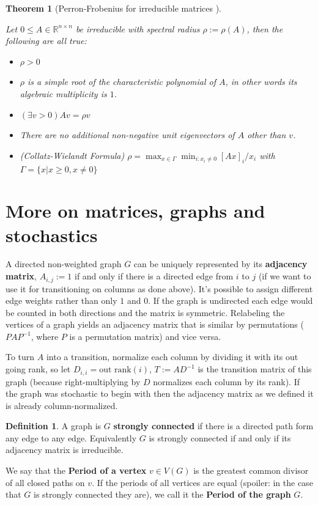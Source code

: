 \documentclass[a4paper,10pt]{article}
\newcommand{\R}{\mathbb{R}}
\newcommand{\gt}{>}
\theoremstyle{definition}
\newtheorem{mydef}{Definition}[section]
\theoremstyle{remark}
\theoremstyle{plain}
\newtheorem{thm}{Theorem}[section]
\begin{document}
\begin{thm}[Perron-Frobenius for irreducible matrices \autocite{meyer2000matrix}]
\label{thm:perron2}

Let $0 \leq A \in \R^{n \times n}$ be irreducible with spectral radius $\rho := \rho(A)$,
then the following are all true:
\begin{itemize}
\item{} $\rho \gt 0$
\item{} $\rho$ is a simple root of the characteristic polynomial of $A$,
in other words its algebraic multiplicity is $1$.
\item{} $(\exists v > 0) Av=\rho v$
\item{} There are no additional non-negative unit eigenvectors of $A$ other than
$v$. 
\item{(Collatz-Wielandt Formula)} $\rho = \max_{x \in \Gamma} \min_{i : x_i \neq 0} [Ax]_i / x_i$
with $\Gamma = \{x | x \geq 0, x \neq 0\}$
\end{itemize}
\end{thm}


\section{More on matrices, graphs and stochastics}

A directed non-weighted graph $G$ can be uniquely represented by its
\textbf{adjacency matrix},
$A_{i,j} := 1$ if and only if there is a directed edge from $i$ to $j$ (if we
want to use it for transitioning on columns as done above). It's possible to
assign different edge weights rather than only $1$ and $0$. If the graph is
undirected each edge would be counted in both directions and the matrix is
symmetric.
Relabeling the vertices of a graph yields an adjacency matrix that is similar by
permutations ($PAP^{-1}$, where $P$ is a permutation matrix) and vice versa.

To turn $A$ into a transition, normalize each column by dividing it with
its out going rank, so let $D_{i,i} = \text{out~rank}(i)$, $T:=AD^{-1}$ is the
transition matrix of this graph (because right-multiplying by $D$ normalizes each
column by its rank).
If the graph was stochastic to begin with then the adjacency matrix as we
defined it is already column-normalized.

\begin{mydef}
\label{def:stronglyconnected}
A graph is $G$ \textbf{strongly connected} if there is a directed path form any edge
to any edge. Equivalently $G$ is strongly connected if and only if its adjacency matrix is irreducible.

We say that the \textbf{Period of a vertex} $v \in V(G)$ is the greatest common
divisor of all closed paths on $v$. If the periods of all vertices are equal
(spoiler: in the case that $G$ is strongly connected they are), we call it the
\textbf{Period of the graph} $G$.
\end{mydef}
\end{document}
